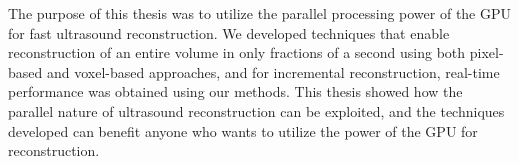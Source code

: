 The purpose of this thesis was to utilize the parallel processing power of the GPU for fast ultrasound reconstruction. We developed techniques that enable reconstruction of an entire volume in only fractions of a second using both pixel-based and voxel-based approaches, and for incremental reconstruction, real-time performance was obtained using our methods. This thesis showed how the parallel nature of ultrasound reconstruction can be exploited, and the techniques developed can benefit anyone who wants to utilize the power of the GPU for reconstruction.